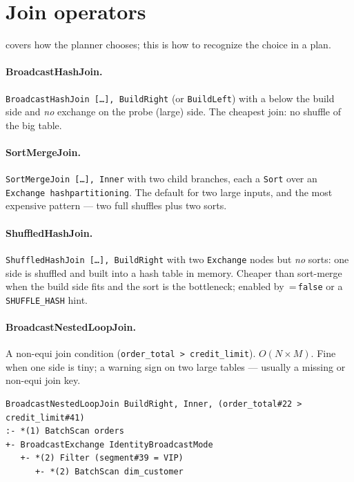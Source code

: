 \section{Join operators}
\label{sec:c-joins}

 covers how the planner chooses; this is how to recognize the
choice in a plan.

\paragraph{BroadcastHashJoin.} \texttt{BroadcastHashJoin [\ldots], BuildRight}
(or \texttt{BuildLeft}) with a  below the build side and
\emph{no} exchange on the probe (large) side. The cheapest join: no shuffle of
the big table.

\paragraph{SortMergeJoin.} \texttt{SortMergeJoin [\ldots], Inner} with two child
branches, each a \texttt{Sort} over an \texttt{Exchange hashpartitioning}. The
default for two large inputs, and the most expensive pattern --- two full
shuffles plus two sorts.

\paragraph{ShuffledHashJoin.} \texttt{ShuffledHashJoin [\ldots], BuildRight} with
two \texttt{Exchange} nodes but \emph{no} sorts: one side is shuffled and built
into a hash table in memory. Cheaper than sort-merge when the build side fits and
the sort is the bottleneck; enabled by
\,=\,\texttt{false} or a
\texttt{SHUFFLE\_HASH} hint.

\paragraph{BroadcastNestedLoopJoin.} A non-equi join condition (\texttt{order\_total >
credit\_limit}). $O(N \times M)$. Fine when one side is tiny; a warning sign on two
large tables --- usually a missing or non-equi join key.

\begin{lstlisting}[language=text,numbers=none,caption={BroadcastNestedLoopJoin on a non-equi condition},captionpos=b]
BroadcastNestedLoopJoin BuildRight, Inner, (order_total#22 > credit_limit#41)
:- *(1) BatchScan orders
+- BroadcastExchange IdentityBroadcastMode
   +- *(2) Filter (segment#39 = VIP)
      +- *(2) BatchScan dim_customer
\end{lstlisting}

